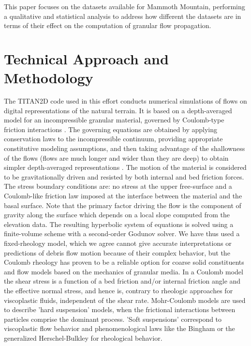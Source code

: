 \documentclass[12pt,letterpaper]{article}
\begin{document}
This paper focuses on the datasets available for Mammoth Mountain, performing a
qualitative and statistical analysis to address how different the
datasets are in terms of their effect on the computation of granular
flow propagation.


\section{Technical Approach and Methodology}\label{technical}
The TITAN2D code used in this effort conducts numerical simulations of
flows on digital representations of the natural terrain.  It is based
on a depth-averaged model for an incompressible granular material,
governed by Coulomb-type friction interactions \citep{Savage1989}.
The governing equations are obtained by applying conservation laws to
the incompressible continuum, providing appropriate constitutive
modeling assumptions, and then taking advantage of the shallowness of
the flows (flows are much longer and wider than they are deep) to
obtain simpler depth-averaged representations \citep{Patra2005}. The
motion of the material is considered to be gravitationally driven and
resisted by both internal and bed friction forces. The stress boundary
conditions are: no stress at the upper free-surface and a Coulomb-like
friction law imposed at the interface between the material and the
basal surface. Note that the primary factor driving the flow is the
component of gravity along the surface which depends on a local slope
computed from the elevation data.  The resulting hyperbolic system of
equations is solved using a finite-volume scheme with a second-order
Godunov solver. We have thus used a fixed-rheology model, which we agree cannot
  give accurate interpretations or predictions of debris flow motion
  because of their complex behavior, but the Coulomb rheology has
  proven to be a reliable option for coarse solid constituents and
  flow models based on the mechanics of granular media. In a Coulomb
  model the shear stress is a function of a bed friction and/or
  internal friction angle and the effective normal stress, and
  hence is, contrary to rheologic approaches for viscoplastic fluids,
  independent of the shear rate.  Mohr-Coulomb models are used to
  describe 'hard suspension' models, when the frictional interactions
  between particles comprise the dominant process.  'Soft suspensions'
  correspond to viscoplastic flow behavior and phenomenological laws
  like the Bingham or the generalized Herschel-Bulkley for rheological
  behavior.
\end{document}
